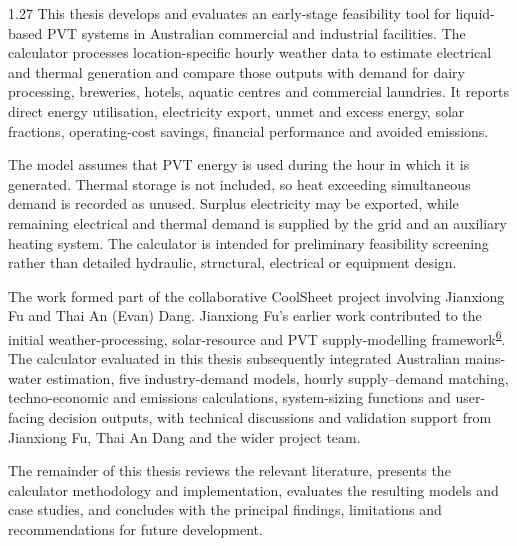 \documentclass[12pt,letterpaper]{article}
\DeclareRobustCommand{\citenum}[1]{\hyperlink{ref:#1}{#1}} %
\begin{document}
\begin{spacing}{1.27}
This thesis develops and evaluates an early-stage feasibility tool for liquid-based PVT systems in Australian commercial and industrial facilities. The calculator processes location-specific hourly weather data to estimate electrical and thermal generation and compare those outputs with demand for dairy processing, breweries, hotels, aquatic centres and commercial laundries. It reports direct energy utilisation, electricity export, unmet and excess energy, solar fractions, operating-cost savings, financial performance and avoided emissions.\par

\vspace{0.15in}

The model assumes that PVT energy is used during the hour in which it is generated. Thermal storage is not included, so heat exceeding simultaneous demand is recorded as unused. Surplus electricity may be exported, while remaining electrical and thermal demand is supplied by the grid and an auxiliary heating system. The calculator is intended for preliminary feasibility screening rather than detailed hydraulic, structural, electrical or equipment design.\par

\vspace{0.15in}

The work formed part of the collaborative CoolSheet project involving Jianxiong Fu and Thai An (Evan) Dang. Jianxiong Fu's earlier work contributed to the initial weather-processing, solar-resource and PVT supply-modelling framework\textsuperscript{\citenum{6}}. The calculator evaluated in this thesis subsequently integrated Australian mains-water estimation, five industry-demand models, hourly supply--demand matching, techno-economic and emissions calculations, system-sizing functions and user-facing decision outputs, with technical discussions and validation support from Jianxiong Fu, Thai An Dang and the wider project team.\par

\vspace{0.15in}

The remainder of this thesis reviews the relevant literature, presents the calculator methodology and implementation, evaluates the resulting models and case studies, and concludes with the principal findings, limitations and recommendations for future development.
\end{spacing}
\end{document}
